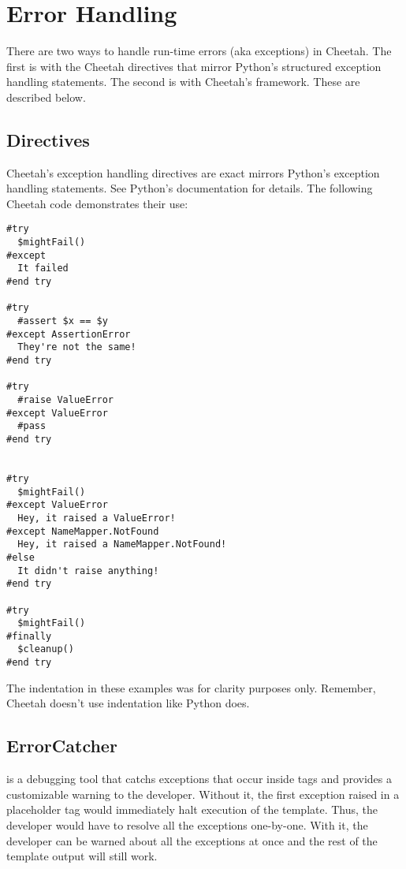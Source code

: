 \section{Error Handling}
\label{errorHandling}

There are two ways to handle run-time errors (aka exceptions) in Cheetah.  The
first is with the Cheetah directives that mirror Python's structured exception
handling statements. The second is with Cheetah's 
framework. These are described below.

\subsection{Directives}
\label{errorHandling.directives}

Cheetah's exception handling directives are exact mirrors Python's exception
handling statements.  See Python's documentation for details.  The following
Cheetah code demonstrates their use:


\begin{verbatim}
#try
  $mightFail()
#except
  It failed
#end try

#try
  #assert $x == $y
#except AssertionError
  They're not the same!
#end try

#try
  #raise ValueError
#except ValueError
  #pass
#end try


#try
  $mightFail()
#except ValueError
  Hey, it raised a ValueError!
#except NameMapper.NotFound
  Hey, it raised a NameMapper.NotFound!
#else
  It didn't raise anything!
#end try

#try
  $mightFail()
#finally
  $cleanup()
#end try

\end{verbatim}    

The indentation in these examples was for clarity purposes only.  Remember,
Cheetah doesn't use indentation like Python does.

\subsection{ErrorCatcher}
\label{errorHandling.errorCatcher}

 is a debugging tool that catchs exceptions that occur inside
 tags and provides a customizable warning to the developer.
Without it, the first exception raised in a placeholder tag would immediately
halt execution of the template. Thus, the developer would have to resolve all
the exceptions one-by-one. With it, the developer can be warned about all the
exceptions at once and the rest of the template output will still work.


